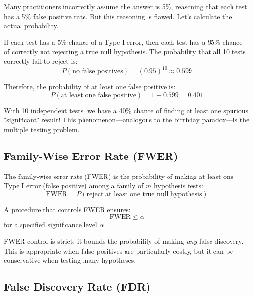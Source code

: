 Many practitioners incorrectly assume the answer is 5\%, reasoning that each test has a 5\% false positive rate. But this reasoning is flawed. Let's calculate the actual probability.

If each test has a 5\% chance of a Type I error, then each test has a 95\% chance of correctly not rejecting a true null hypothesis. The probability that all 10 tests correctly fail to reject is:
\begin{equation}
P(\text{no false positives}) = (0.95)^{10} \approx 0.599
\end{equation}

Therefore, the probability of at least one false positive is:
\begin{equation}
P(\text{at least one false positive}) = 1 - 0.599 = 0.401
\end{equation}

With 10 independent tests, we have a 40\% chance of finding at least one spurious "significant" result! This phenomenon—analogous to the birthday paradox—is the multiple testing problem.

\subsection{Family-Wise Error Rate (FWER)}

\begin{definition}
The family-wise error rate (FWER) is the probability of making at least one Type I error (false positive) among a family of $m$ hypothesis tests:
\begin{equation}
\text{FWER} = P(\text{reject at least one true null hypothesis})
\end{equation}

A procedure that controls FWER ensures:
\begin{equation}
\text{FWER} \leq \alpha
\end{equation}
for a specified significance level $\alpha$.
\end{definition}

FWER control is strict: it bounds the probability of making \textit{any} false discovery. This is appropriate when false positives are particularly costly, but it can be conservative when testing many hypotheses.

\subsection{False Discovery Rate (FDR)}

